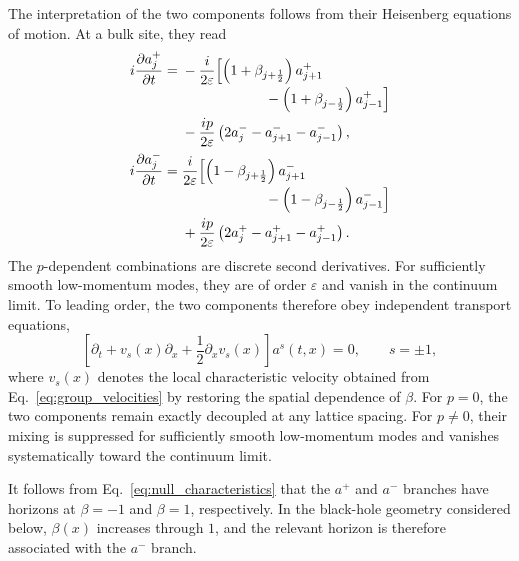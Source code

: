 \documentclass[reprint,amsmath,amssymb,aps,showkeys,superscriptaddress]{revtex4-2}
\begin{document}
The interpretation of the two components follows from their
Heisenberg equations of motion. At a bulk site, they read
\begin{subequations}
\label{eq:a_eom_lattice}
\begin{align}
  i\frac{\partial a_j^+}{\partial t}
  ={}&
  -\frac{i}{2\varepsilon}
  \Bigl[
    \left(
      1+\beta_{j+\frac12}
    \right)a_{j+1}^+
  \nonumber\\[-2pt]
  &\hspace{21mm}
    -
    \left(
      1+\beta_{j-\frac12}
    \right)a_{j-1}^+
  \Bigr]
  \nonumber\\
  &-
  \frac{i p}{2\varepsilon}
  \left(
    2a_j^-
    -a_{j+1}^-
    -a_{j-1}^-
  \right),
  \label{eq:a_plus_eom}
  \\
  i\frac{\partial a_j^-}{\partial t}
  ={}&
  \frac{i}{2\varepsilon}
  \Bigl[
    \left(
      1-\beta_{j+\frac12}
    \right)a_{j+1}^-
  \nonumber\\[-2pt]
  &\hspace{21mm}
    -
    \left(
      1-\beta_{j-\frac12}
    \right)a_{j-1}^-
  \Bigr]
  \nonumber\\
  &+
  \frac{i p}{2\varepsilon}
  \left(
    2a_j^+
    -a_{j+1}^+
    -a_{j-1}^+
  \right).
  \label{eq:a_minus_eom}
\end{align}
\end{subequations}
The $p$-dependent combinations are discrete second derivatives.
For sufficiently smooth low-momentum modes, they are of order
$\varepsilon$ and vanish in the continuum limit. To leading order,
the two components therefore obey independent transport equations,
\begin{equation}
  \left[
    \partial_t
    +v_s(x)\partial_x
    +\frac{1}{2}\partial_xv_s(x)
  \right]
  a^s(t,x)
  =
  0,
  \qquad
  s=\pm1,
  \label{eq:continuum_transport}
\end{equation}
where $v_s(x)$ denotes the local characteristic velocity obtained
from Eq.~\eqref{eq:group_velocities} by restoring the spatial
dependence of $\beta$. For $p=0$, the two components remain exactly
decoupled at any lattice spacing. For $p\neq0$, their mixing is
suppressed for sufficiently smooth low-momentum modes and vanishes
systematically toward the continuum limit.

It follows from Eq.~\eqref{eq:null_characteristics} that the
$a^+$ and $a^-$ branches have horizons at $\beta=-1$ and
$\beta=1$, respectively. In the black-hole geometry considered
below, $\beta(x)$ increases through $1$, and the relevant horizon
is therefore associated with the $a^-$ branch.
\end{document}

